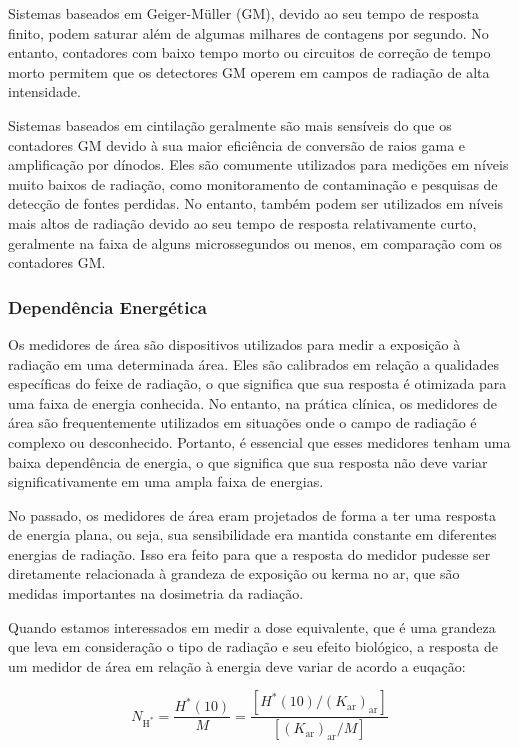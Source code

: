\documentclass[11pt,a4paper]{article}
\begin{document}
	Sistemas baseados em Geiger-Müller (GM), devido ao seu tempo de resposta finito, podem saturar além de algumas milhares de contagens por segundo. No entanto, contadores com baixo tempo morto ou circuitos de correção de tempo morto permitem que os detectores GM operem em campos de radiação de alta intensidade.

	Sistemas baseados em cintilação geralmente são mais sensíveis do que os contadores GM devido à sua maior eficiência de conversão de raios gama e amplificação por dínodos. Eles são comumente utilizados para medições em níveis muito baixos de radiação, como monitoramento de contaminação e pesquisas de detecção de fontes perdidas. No entanto, também podem ser utilizados em níveis mais altos de radiação devido ao seu tempo de resposta relativamente curto, geralmente na faixa de alguns microssegundos ou menos, em comparação com os contadores GM.

\subsubsection*{Dependência Energética}

	Os medidores de área são dispositivos utilizados para medir a exposição à radiação em uma determinada área. Eles são calibrados em relação a qualidades específicas do feixe de radiação, o que significa que sua resposta é otimizada para uma faixa de energia conhecida. No entanto, na prática clínica, os medidores de área são frequentemente utilizados em situações onde o campo de radiação é complexo ou desconhecido. Portanto, é essencial que esses medidores tenham uma baixa dependência de energia, o que significa que sua resposta não deve variar significativamente em uma ampla faixa de energias.

	No passado, os medidores de área eram projetados de forma a ter uma resposta de energia plana, ou seja, sua sensibilidade era mantida constante em diferentes energias de radiação. Isso era feito para que a resposta do medidor pudesse ser diretamente relacionada à grandeza de exposição ou kerma no ar, que são medidas importantes na dosimetria da radiação.

	Quando estamos interessados em medir a dose equivalente, que é uma grandeza que leva em consideração o tipo de radiação e seu efeito biológico, a resposta de um medidor de área em relação à energia deve variar de acordo a euqação:
	
	\begin{equation}
		N_{\text{H}^{\ast}} = \frac{H^{\ast}(10)}{M} = \frac{\left[H^{\ast}(10)/(K_{\text{ar}})_{\text{ar}}
		\right]}{\left[(K_{\text{ar}})_{\text{ar}}/M\right]}
	\end{equation}
	
\end{document}
